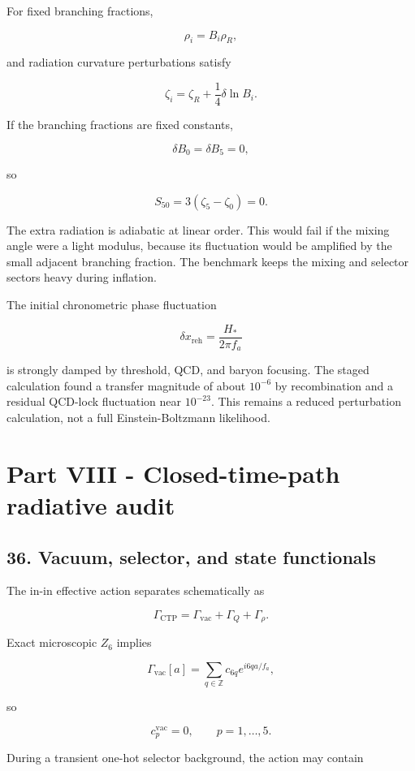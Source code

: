 \documentclass[
]{article}
\begin{document}
For fixed branching fractions,

\[
\rho_i=B_i\rho_R,
\]

and radiation curvature perturbations satisfy

\[
\zeta_i=\zeta_R+\frac14\delta\ln B_i.
\]

If the branching fractions are fixed constants,

\[
\delta B_0=\delta B_5=0,
\]

so

\[
S_{50}=3(\zeta_5-\zeta_0)=0.
\]

The extra radiation is adiabatic at linear order. This would fail if the
mixing angle were a light modulus, because its fluctuation would be
amplified by the small adjacent branching fraction. The benchmark keeps
the mixing and selector sectors heavy during inflation.

The initial chronometric phase fluctuation

\[
\delta x_{\mathrm{reh}}=\frac{H_*}{2\pi f_a}
\]

is strongly damped by threshold, QCD, and baryon focusing. The staged
calculation found a transfer magnitude of about \(10^{-6}\) by
recombination and a residual QCD-lock fluctuation near \(10^{-23}\).
This remains a reduced perturbation calculation, not a full
Einstein-Boltzmann likelihood.

\section{Part VIII - Closed-time-path radiative
audit}\label{part-viii---closed-time-path-radiative-audit}

\subsection{36. Vacuum, selector, and state
functionals}\label{vacuum-selector-and-state-functionals}

The in-in effective action separates schematically as

\[
\Gamma_{\mathrm{CTP}}
=\Gamma_{\mathrm{vac}}+\Gamma_Q+\Gamma_\rho.
\]

Exact microscopic \(Z_6\) implies

\[
\Gamma_{\mathrm{vac}}[a]
=\sum_{q\in\mathbb Z}c_{6q}e^{i6qa/f_a},
\]

so

\[
c_p^{\mathrm{vac}}=0,
\qquad p=1,\ldots,5.
\]

During a transient one-hot selector background, the action may contain
\end{document}
